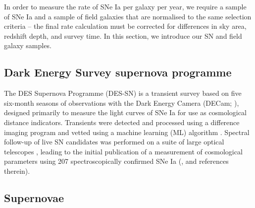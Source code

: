 \documentclass[fleqn,usenatbib]{mnras}
\begin{document}
In order to measure the rate of SNe Ia per galaxy per year, we require a sample of SNe Ia and a sample of field galaxies that are normalised to the same selection criteria -- the final rate calculation must be corrected for differences in sky area, redshift depth, and survey time. In this section, we introduce our SN and field galaxy samples.


\label{sec:data}
\subsection{Dark Energy Survey supernova programme \label{subsec:des}}
The DES Supernova Programme (DES-SN) is a transient survey based on five six-month seasons of observations with the Dark Energy Camera (DECam; \citealt{Flaugher2015}), designed primarily to measure the light curves of SNe Ia for use as cosmological distance indicators. Transients were detected and processed using a difference imaging program \citep{Kessler2015} and vetted using a machine learning (ML) algorithm \citep{Goldstein2015}. Spectral follow-up of live SN candidates was performed on a suite of large optical telescopes \citet{Smith2020a}, leading to the initial publication of a measurement of cosmological parameters using 207 spectroscopically confirmed SNe Ia (\citealt{DESCollaboration2018a}, and references therein). 
\subsection{Supernovae \label{subsec:host_sample}}
\end{document}
